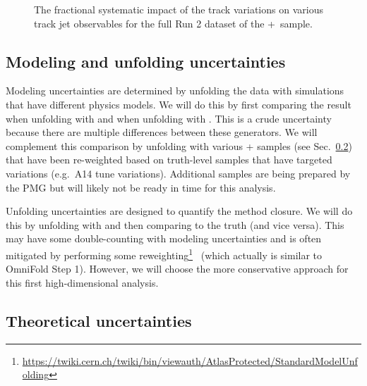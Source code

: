 \begin{figure}[h!]
  \caption{The fractional systematic impact of the track variations on various track jet observables for the full Run 2 dataset of the \powheg+\pythia~sample.}
  \label{fig:PP8TrackJetSyst}
\end{figure}

\subsection{Modeling and unfolding uncertainties}

Modeling uncertainties are determined by unfolding the data with simulations that have different physics models.  We will do this by first comparing the result when unfolding with \pythia{} and when unfolding with \sherpa.  This is a crude uncertainty because there are multiple differences between these generators.  We will complement this comparison by unfolding with various \powheg+\pythia{} samples (see Sec.~\ref{sec:theoryuncerts}) that have been re-weighted based on truth-level samples that have targeted variations (e.g.\ A14 tune variations).  Additional samples are being prepared by the PMG but will likely not be ready in time for this analysis.

Unfolding uncertainties are designed to quantify the method closure.  We will do this by unfolding \pythia{} with \sherpa{} and then comparing to the \pythia{} truth (and vice versa).  This may have some double-counting with modeling uncertainties and is often mitigated by performing some reweighting\footnote{\url{https://twiki.cern.ch/twiki/bin/viewauth/AtlasProtected/StandardModelUnfolding}}~\cite{Malaescu:2009dm} (which actually is similar to OmniFold Step 1).  However, we will choose the more conservative approach for this first high-dimensional analysis.

\clearpage

\subsection{Theoretical uncertainties}
\label{sec:theoryuncerts}
